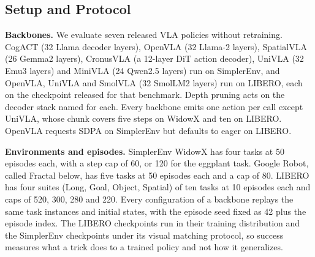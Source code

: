 %

\subsection{Setup and Protocol}

\textbf{Backbones.} We evaluate seven released VLA policies without
retraining. CogACT (32 Llama decoder layers), OpenVLA (32 Llama-2
layers), SpatialVLA (26 Gemma2 layers), CronusVLA (a 12-layer DiT action
decoder), UniVLA (32 Emu3 layers) and MiniVLA (24 Qwen2.5 layers) run on
SimplerEnv, and OpenVLA, UniVLA and SmolVLA (32 SmolLM2 layers) run on
LIBERO, each on the checkpoint released for that benchmark. Depth pruning
acts on the decoder stack named for each. Every backbone emits one action
per call except UniVLA, whose chunk covers five steps on WidowX and ten on
LIBERO. OpenVLA requests SDPA on SimplerEnv but defaults to eager on
LIBERO.

\textbf{Environments and episodes.} SimplerEnv WidowX has four tasks at 50
episodes each, with a step cap of 60, or 120 for the eggplant task. Google
Robot, called Fractal below, has five tasks at 50 episodes each and a cap of
80. LIBERO has four suites (Long, Goal, Object, Spatial) of ten tasks at 10
episodes each and caps of 520, 300, 280 and 220. Every
configuration of a backbone replays the same task instances and initial
states, with the episode seed fixed as 42 plus the episode index. The
LIBERO checkpoints run in their training distribution and the SimplerEnv
checkpoints under its visual matching protocol, so success measures what
a trick does to a trained policy and not how it generalizes.

